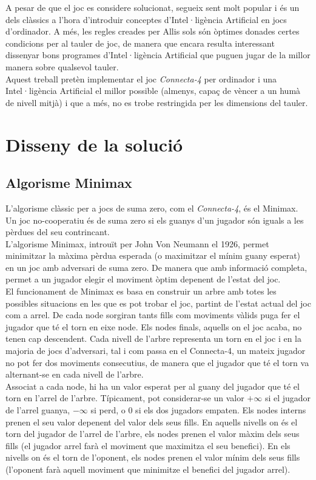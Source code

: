 \documentclass[12pt,a4paper]{article}
\begin{document}
A pesar de que el joc es considere solucionat, segueix sent molt popular i és un dels clàssics a l'hora d'introduir conceptes d'Intel·ligència Artificial en jocs d'ordinador. A més, les regles creades per Allis sols són òptimes donades certes condicions per al tauler de joc, de manera que encara resulta interessant dissenyar bons programes d'Intel·ligència Artificial que puguen jugar de la millor manera sobre qualsevol tauler.\\

Aquest treball pretèn implementar el joc \emph{Connecta-4} per ordinador i una Intel·ligència Artificial el millor possible (almenys, capaç de vèncer a un humà de nivell mitjà) i que a més, no es trobe restringida per les dimensions del tauler.

\section{Disseny de la solució}
\subsection{Algorisme Minimax}
L'algorisme clàssic per a jocs de suma zero, com el \emph{Connecta-4}, és el Minimax. Un joc no-cooperatiu és de suma zero si els guanys d'un jugador són iguals a les pèrdues del seu contrincant.\\

L'algorisme Minimax, introuït per John Von Neumann el 1926\cite{neumann1928theorie}, permet minimitzar la màxima pèrdua esperada (o maximitzar el mínim guany esperat) en un joc amb adversari de suma zero. De manera que amb informació completa, permet a un jugador elegir el moviment òptim depenent de l'estat del joc.\\

El funcionament de Minimax es basa en construir un arbre amb totes les possibles situacions en les que es pot trobar el joc, partint de l'estat actual del joc com a arrel. De cada node sorgiran tants fills com moviments vàlids puga fer el jugador que té el torn en eixe node. Els nodes finals, aquells on el joc acaba, no tenen cap descendent. Cada nivell de l'arbre representa un torn en el joc i en la majoria de jocs d'adversari, tal i com passa en el Connecta-4, un mateix jugador no pot fer dos moviments consecutius, de manera que el jugador que té el torn va alternant-se en cada nivell de l'arbre.\\

Associat a cada node, hi ha un valor esperat per al guany del jugador que té el torn en l'arrel de l'arbre. Típicament, pot considerar-se un valor $+\infty$ si el jugador de l'arrel guanya, $-\infty$ si perd, o $0$ si els dos jugadors empaten. Els nodes interns prenen el seu valor depenent del valor dels seus fills. En aquells nivells on és el torn del jugador de l'arrel de l'arbre, els nodes prenen el valor màxim dels seus fills (el jugador arrel farà el moviment que maximitza el seu benefici). En els nivells on és el torn de l'oponent, els nodes prenen el valor mínim dels seus fills (l'oponent farà aquell moviment que minimitze el benefici del jugador arrel).\\
\end{document}
